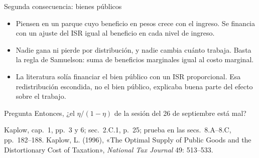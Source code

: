 \documentclass[aspectratio=169,11pt]{beamer}
\newcommand{\fuente}[1]{\par\vfill{\small\color{cGris}#1\par}}
\begin{document}
\begin{frame}{Segunda consecuencia: bienes públicos}
  \begin{itemize}
    \item Piensen en un parque cuyo beneficio en pesos crece con el ingreso. Se financia con un ajuste del ISR igual al beneficio en cada nivel de ingreso.
    \item Nadie gana ni pierde por distribución, y nadie cambia cuánto trabaja. Basta la regla de Samuelson: suma de beneficios marginales igual al costo marginal.
  \end{itemize}
  \pause
  \begin{itemize}
    \item La literatura solía financiar el bien público con un ISR proporcional. Esa redistribución escondida, no el bien público, explicaba buena parte del efecto sobre el trabajo.
  \end{itemize}
  \pause
  \begin{alertblock}{Pregunta}
    Entonces, ¿el $\eta/(1-\eta)$ de la sesión del 26 de septiembre está mal?
  \end{alertblock}
  \fuente{Kaplow, cap.~1, pp.~3 y 6; sec.~2.C.1, p.~25; prueba en las secs.~8.A--8.C, pp.~182--188. Kaplow, L. (1996), «The Optimal Supply of Public Goods and the Distortionary Cost of Taxation», \emph{National Tax Journal} 49: 513--533.}
\end{frame}
\end{document}
